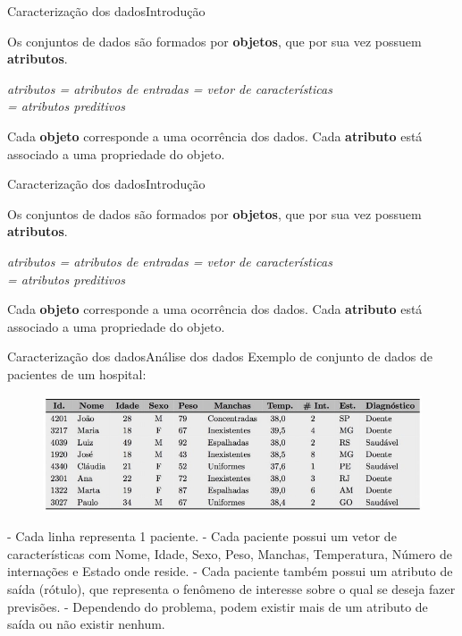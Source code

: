 \documentclass[t]{beamer}
\begin{document}

\begin{ftst}{Caracterização dos dados}{Introdução}

Os conjuntos de dados são formados por \textbf{objetos}, que por sua vez possuem\textbf{ atributos}.
\vone
\vone
\begin{center}
    \textit{atributos = atributos de entradas = vetor de características\\ = atributos preditivos}
\end{center}

\vone
Cada \textbf{objeto} corresponde a uma ocorrência dos dados. 
\vone
Cada \textbf{atributo} está associado a uma propriedade do objeto.

\end{ftst}


\begin{ftst}{Caracterização dos dados}{Introdução}

Os conjuntos de dados são formados por \textbf{objetos}, que por sua vez possuem\textbf{ atributos}.
\vone
\vone
\begin{center}
    \textit{atributos = atributos de entradas = vetor de características\\ = atributos preditivos}
\end{center}

\vone
Cada \textbf{objeto} corresponde a uma ocorrência dos dados. 
\vone
Cada \textbf{atributo} está associado a uma propriedade do objeto.

\end{ftst}


\begin{ftst}{Caracterização dos dados}{Análise dos dados}
Exemplo de conjunto de dados de pacientes de um hospital:

\begin{figure}
    \centering
    \includegraphics[scale=0.5]{Figuras/slide01_02.jpg}
\end{figure}

\scriptsize
- Cada linha representa 1 paciente.
\vone
- Cada paciente possui um vetor de características com Nome, Idade, Sexo, Peso, Manchas, Temperatura, Número de internações e Estado onde reside.
\vone
- Cada paciente também possui um atributo de saída (rótulo), que representa o fenômeno de interesse sobre o qual se deseja fazer previsões.
\vone
- Dependendo do problema, podem existir mais de um atributo de saída ou não existir nenhum.


\end{ftst}
\end{document}
